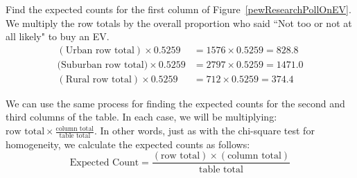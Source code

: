 \begin{examplewrap}
\begin{nexample}{Find the expected counts for the first column of Figure~\ref{pewResearchPollOnEV}.}
We multiply the row totals by the overall proportion who said ``Not too or not at all likely" to buy an EV.  
\begin{align*}
(\text{Urban row total})\times  0.5259&=1576\times  0.5259= 828.8 \\
(\text{Suburban row total)} \times 0.5259 &= 2797\times 0.5259= 1471.0 \\
(\text{Rural row total}) \times 0.5259 &=712\times 0.5259 = 374.4
\end{align*}
\end{nexample}
\end{examplewrap}

\D{\newpage}

We can use the same process for finding the expected counts for the second and third columns of the table.  In each case, we will be multiplying:  $\text{row total}\times \frac{\text{column total}}{\text{table total}}$.  In other words, just as with the chi-square test for homogeneity, we calculate the expected counts as follows:
$$\text{Expected Count} = \frac{(\text{row total}) \times  (\text{column total})}{\text{table total}}$$

